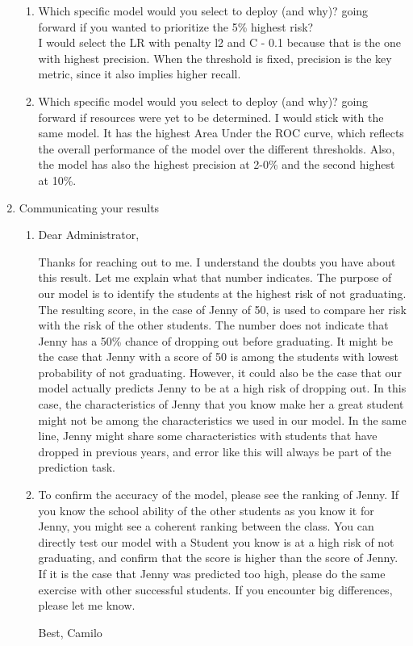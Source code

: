 \documentclass[a4paper, 11pt]{article}
\begin{document}
\begin{enumerate}
\begin{enumerate}
\item Which specific model would you select to deploy (and why)? going forward if you wanted to prioritize the 5\% highest risk?\\
I would select the LR with penalty l2 and C - 0.1 because that is the one with highest precision. When the threshold is fixed, precision is the key metric, since it also implies higher recall. 

\item Which specific model would you select to deploy (and why)? going forward if resources were yet to be determined.
I would stick with the same model. It has the highest Area Under the ROC curve, which reflects the overall performance of the model over the different thresholds. Also, the model has also the highest precision at 2-0\% and the second highest at 10\%.


\end{enumerate}

\item Communicating your results
\begin{enumerate}

\item

Dear Administrator,

Thanks for reaching out to me. I understand the doubts you have about this result. Let me explain what that number indicates. The purpose of our model is to identify the students at the highest risk of not graduating. The resulting score, in the case of Jenny of 50, is used to compare her risk with the risk of the other students. The number does not indicate that Jenny has a 50\% chance of dropping out before graduating. It might be the case that Jenny with a score of 50 is among the students with lowest probability of not graduating. However, it could also be the case that our model actually predicts Jenny to be at a high risk of dropping out. In this case, the characteristics of Jenny that you know make her a great student might not be among the characteristics we used in our model. In the same line, Jenny might share some characteristics with students that have dropped in previous years, and error like this will always be part of the prediction task.

\item
To confirm the accuracy of the model, please see the ranking of Jenny. If you know the school ability of the other students as you know it for Jenny, you might see a coherent ranking between the class. You can directly test our model with a Student you know is at a high risk of not graduating, and confirm that the score is higher than the score of Jenny. If it is the case that Jenny was predicted too high, please do the same exercise with other successful students. If you encounter big differences, please let me know.

Best,
Camilo

\end{enumerate}
\end{enumerate}
\end{document}
